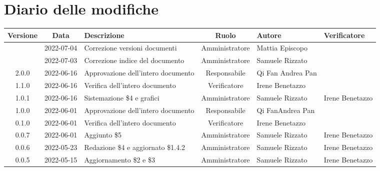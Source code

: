 \section*{Diario delle modifiche}
	\begin{center}
	\renewcommand{\arraystretch}{1.8} %
	\begin{longtable}{ |c|c|p{8em}|c|m{5em}|m{6em}| }
		\hline
		\textbf{Versione} & \textbf{Data} & \textbf{Descrizione} &  \textbf{Ruolo} &  \textbf{Autore} & \textbf{Verificatore} \\
		\hline
		& 2022-07-04 & Correzione versioni documenti & Amministratore & Mattia \newline Episcopo & \\
		\hline
		 & 2022-07-03 & Correzione indice del documento & Amministratore & Samuele \newline Rizzato & \\
		\hline
		2.0.0 & 2022-06-16 & Approvazione dell'intero documento & Responsabile & Qi Fan \newline Andrea Pan & \\
		\hline
		1.1.0 & 2022-06-16 & Verifica dell'intero documento & Verificatore & Irene \newline Benetazzo & \\
		\hline
		1.0.1 & 2022-06-16 & Sistemazione \$4 e grafici & Amministratore & Samuele \newline Rizzato & Irene \newline Benetazzo \\
		\hline
		1.0.0 & 2022-06-01 & Approvazione dell'intero documento & Responsabile &Qi Fan\newline Andrea Pan & \\
		\hline
		0.1.0 & 2022-06-01 & Verifica dell'intero documento & Verificatore &Irene \newline Benetazzo & \\
		\hline
		0.0.7 & 2022-06-01 & Aggiunto \$5 & Amministratore & Samuele \newline Rizzato & Irene \newline Benetazzo \\
		\hline
		0.0.6 & 2022-05-23 & Redazione \$4 e aggiornato \$1.4.2 & Amministratore & Samuele \newline Rizzato & Irene \newline Benetazzo \\
		\hline
		0.0.5 & 2022-05-15 & Aggiornamento \$2 e \$3 & Amministratore & Samuele \newline Rizzato & Irene \newline Benetazzo \\

\end{longtable}
\end{center}
